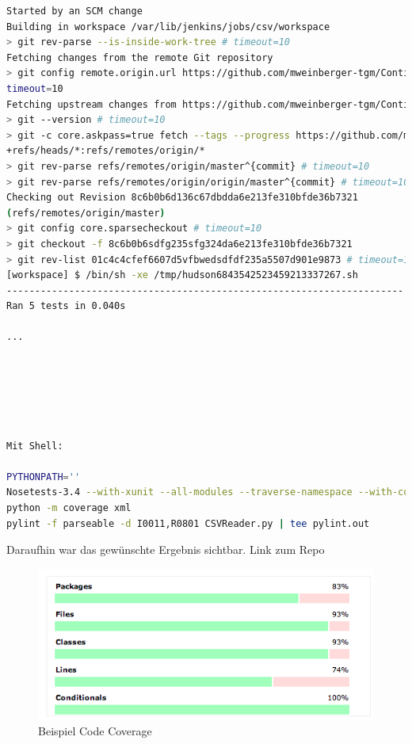 \documentclass[letterpaper, 12pt]{article}
\begin{document}
\begin{lstlisting}[frame=single,language=bash, caption=Build \#1]
Started by an SCM change
Building in workspace /var/lib/jenkins/jobs/csv/workspace
> git rev-parse --is-inside-work-tree # timeout=10
Fetching changes from the remote Git repository
> git config remote.origin.url https://github.com/mweinberger-tgm/Continuous-Integration.git #
timeout=10
Fetching upstream changes from https://github.com/mweinberger-tgm/Continuous-Integration.git
> git --version # timeout=10
> git -c core.askpass=true fetch --tags --progress https://github.com/mweinberger-tgm/Continuous-Integration.git
+refs/heads/*:refs/remotes/origin/*
> git rev-parse refs/remotes/origin/master^{commit} # timeout=10
> git rev-parse refs/remotes/origin/origin/master^{commit} # timeout=10
Checking out Revision 8c6b0b6d136c67dbdda6e213fe310bfde36b7321
(refs/remotes/origin/master)
> git config core.sparsecheckout # timeout=10
> git checkout -f 8c6b0b6sdfg235sfg324da6e213fe310bfde36b7321
> git rev-list 01c4c4cfef6607d5vfbwedsdfdf235a5507d901e9873 # timeout=10
[workspace] $ /bin/sh -xe /tmp/hudson6843542523459213337267.sh
----------------------------------------------------------------------
Ran 5 tests in 0.040s

...






Mit Shell:

PYTHONPATH=''
Nosetests-3.4 --with-xunit --all-modules --traverse-namespace --with-coverage --cover-package=project1 --cover-inclusive
python -m coverage xml
pylint -f parseable -d I0011,R0801 CSVReader.py | tee pylint.out

\end{lstlisting}

Daraufhin war das gewünschte Ergebnis sichtbar. Link zum Repo \cite{repo}

\begin{figure}[!h]
	\begin{center}
		\includegraphics[width=1\linewidth]{images/coverage}
		\caption{Beispiel Code Coverage}
		\label{Beispiel Code Coverage}
	\end{center}
\end{figure}

\clearpage



\lstlistoflistings
\listoffigures
\end{document}

